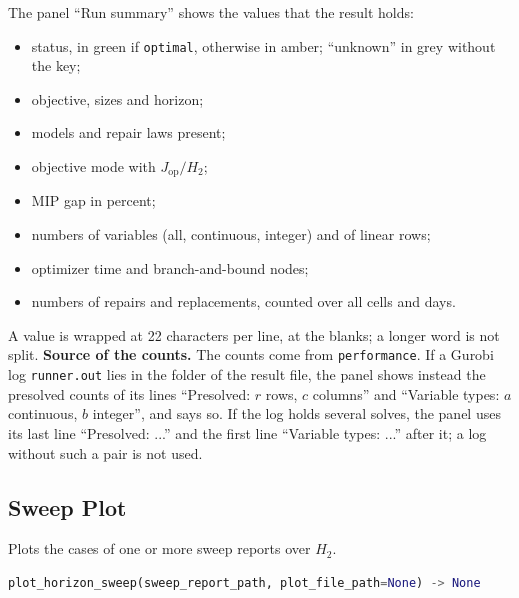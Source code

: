 \tabend

The panel ``Run summary'' shows the values that the result holds:
\begin{itemize}[nosep]
  \item status, in green if \texttt{optimal}, otherwise in amber; ``unknown'' in grey without the key;
  \item objective, sizes and horizon;
  \item models and repair laws present;
  \item objective mode with $J_{\mathrm{op}}/H_2$;
  \item MIP gap in percent;
  \item numbers of variables (all, continuous, integer) and of linear rows;
  \item optimizer time and branch-and-bound nodes;
  \item numbers of repairs and replacements, counted over all cells and days.
\end{itemize}
A value is wrapped at 22 characters per line, at the blanks; a longer word is not split.
\textbf{Source of the counts.} The counts come from \texttt{performance}. If a Gurobi log \texttt{runner.out} lies in the folder of the result file, the panel shows instead the presolved counts of its lines ``Presolved: $r$ rows, $c$ columns'' and ``Variable types: $a$ continuous, $b$ integer'', and says so. If the log holds several solves, the panel uses its last line ``Presolved: ...'' and the first line ``Variable types: ...'' after it; a log without such a pair is not used.

\subsection{Sweep Plot}

Plots the cases of one or more sweep reports over $H_2$.

\begin{lstlisting}[language=Python]
plot_horizon_sweep(sweep_report_path, plot_file_path=None) -> None
\end{lstlisting}

